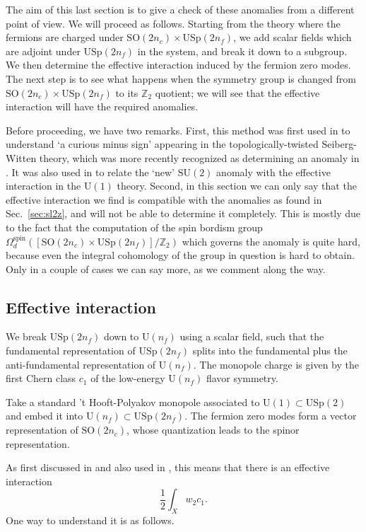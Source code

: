 \documentclass[12pt]{article}
\numberwithin{equation}{section}
\def\bZ{\mathbb{Z}}
\def\U{\mathrm{U}}
\def\SU{\mathrm{SU}}
\def\SO{\mathrm{SO}}
\def\USp{\mathrm{USp}}
\begin{document}
The aim of this last section is to give a check of these anomalies from a different point of view.
We will proceed as follows. 
Starting from the theory where the fermions are charged under $\SO(2n_c)\times \USp(2n_f)$,
we add scalar fields which are adjoint under $\USp(2n_f)$ in the system, and break it down to a subgroup.
We then determine the effective interaction induced by the fermion zero modes.
The next step is to see what happens when the symmetry group is changed from $\SO(2n_c)\times \USp(2n_f)$ to its $\bZ_2$ quotient;
we will see that the effective interaction will have the required anomalies.

Before proceeding, we have two remarks.
First, this method was first used in \cite[Sec.~4]{Witten:1995gf} to understand `a curious minus sign' 
appearing in the topologically-twisted Seiberg-Witten theory, 
which was more recently recognized as determining an anomaly in \cite[Sec.~2.4.3]{Cordova:2018acb}.
It was also used in \cite[Sec.~3.1 and Sec.~5.1.2]{Wang:2018qoy} to relate the `new' $\SU(2)$ anomaly 
with the effective interaction in the $\U(1)$ theory.
Second, in this section we can only say that the effective interaction we find is compatible with the anomalies
as found in Sec.~\ref{sec:sl2z},
and will not be able to determine it completely.
This is mostly due to the fact that the computation of the spin bordism group $\Omega^\text{spin}_d([\SO(2n_c)\times \USp(2n_f)]/\bZ_2)$ which governs the anomaly is quite hard, 
because even the integral cohomology of the group in question is hard to obtain.
Only in a couple of cases we can say more, as we comment along the way.

\subsection{Effective interaction}
We break $\USp(2n_f)$ down to $\U(n_f)$ using a scalar field,
such that the fundamental representation of $\USp(2n_f)$ splits into the fundamental plus the anti-fundamental representation of $\U(n_f)$.
The monopole charge is given by the first Chern class $c_1$ of the low-energy $\U(n_f)$ flavor symmetry.

Take a standard 't Hooft-Polyakov monopole associated to $\U(1)\subset \USp(2)$
and embed it into  $\U(n_f)\subset \USp(2n_f)$.
The fermion zero modes form a vector representation of $\SO(2n_c)$,
whose quantization leads to the spinor representation.

As first discussed in \cite{Thorngren:2014pza} and also used in \cite[Sec.~3.1]{Wang:2018qoy},
this means that there is an effective interaction \begin{equation}
 \frac12 \int_X w_2 c_1.
 \label{bulk}
\end{equation} %
One way to understand it is as follows.
\end{document}

